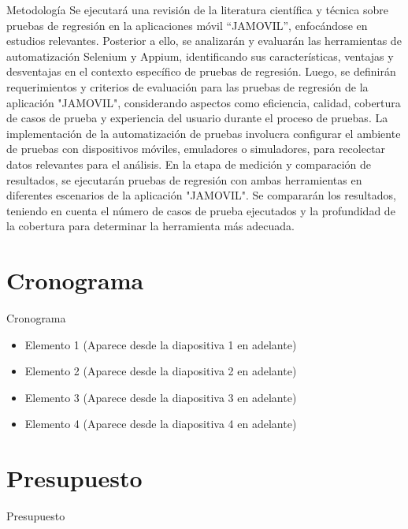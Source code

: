 \documentclass{beamer}
\begin{document}
\begin{frame}{Metodología}
Se ejecutará una revisión de la literatura científica y técnica sobre pruebas de regresión en la aplicaciones móvil “JAMOVIL”, enfocándose en estudios relevantes. Posterior a ello, se analizarán y evaluarán las herramientas de automatización Selenium y Appium, identificando sus características, ventajas y desventajas en el contexto específico de pruebas de regresión.
Luego, se definirán requerimientos y criterios de evaluación para las pruebas de regresión de la aplicación "JAMOVIL", considerando aspectos como eficiencia, calidad, cobertura de casos de prueba y experiencia del usuario durante el proceso de pruebas.
La implementación de la automatización de pruebas involucra configurar el ambiente de pruebas con dispositivos móviles, emuladores o simuladores,  para recolectar datos relevantes para el análisis.
En la etapa de medición y comparación de resultados, se ejecutarán pruebas de regresión con ambas herramientas en diferentes escenarios de la aplicación "JAMOVIL". Se compararán los resultados, teniendo en cuenta el número de casos de prueba ejecutados y la profundidad de la cobertura para determinar la herramienta más adecuada. 
\end{frame}



\section{Cronograma}

\begin{frame}{Cronograma}
  \begin{itemize}
    \item<1-> Elemento 1 (Aparece desde la diapositiva 1 en adelante)
    \item<2-> Elemento 2 (Aparece desde la diapositiva 2 en adelante)
    \item<3-> Elemento 3 (Aparece desde la diapositiva 3 en adelante)
    \item<4-> Elemento 4 (Aparece desde la diapositiva 4 en adelante)
  \end{itemize}
\end{frame}

\section{Presupuesto}
\begin{frame}{Presupuesto}
    
\end{frame}
\end{document}
